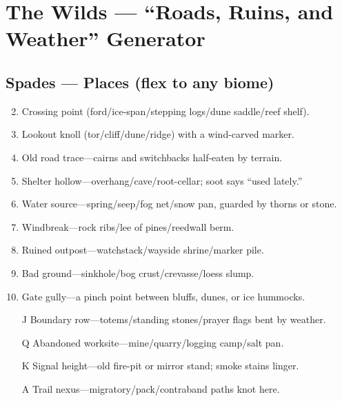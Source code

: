 \chapter{The Wilds --- ``Roads, Ruins, and Weather'' Generator}

\section*{Spades --- Places (flex to any biome)}
\begin{enumerate}
\setcounter{enumi}{1}
\item Crossing point (ford/ice-span/stepping logs/dune saddle/reef shelf).
\item Lookout knoll (tor/cliff/dune/ridge) with a wind-carved marker.
\item Old road trace---cairns and switchbacks half-eaten by terrain.
\item Shelter hollow---overhang/cave/root-cellar; soot says ``used lately.''
\item Water source---spring/seep/fog net/snow pan, guarded by thorns or stone.
\item Windbreak---rock ribs/lee of pines/reedwall berm.
\item Ruined outpost---watchstack/wayside shrine/marker pile.
\item Bad ground---sinkhole/bog crust/crevasse/loess slump.
\item Gate gully---a pinch point between bluffs, dunes, or ice hummocks.
\item[J] Boundary row---totems/standing stones/prayer flags bent by weather.
\item[Q] Abandoned worksite---mine/quarry/logging camp/salt pan.
\item[K] Signal height---old fire-pit or mirror stand; smoke stains linger.
\item[A] Trail nexus---migratory/pack/contraband paths knot here.
\end{enumerate}

